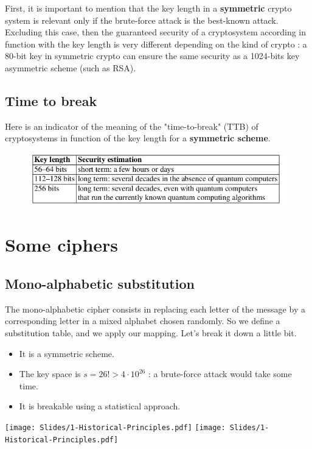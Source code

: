 \documentclass[a4paper, 12pt]{book}
\begin{document}
First, it is important to mention that the key length in a \textbf{symmetric} crypto system is relevant only if the brute-force attack is the best-known attack. \\

Excluding this case, then the guaranteed security of a cryptosystem according in function with the key length is very different depending on the kind of crypto : a 80-bit key in symmetric crypto can ensure the same security as a 1024-bits key asymmetric scheme (such as RSA).

\subsection{Time to break}
Here is an indicator of the meaning of the "time-to-break" (TTB) of cryptosystems in function of the key length for a \textbf{symmetric scheme}.
\begin{figure}[h]
    \centering
    \includegraphics[width=0.7\linewidth]{images/1-TTB.png}
\end{figure}
\section{Some ciphers}
\subsection{Mono-alphabetic substitution}
The mono-alphabetic cipher consists in replacing each letter of the message by a corresponding letter in a mixed alphabet chosen randomly. So we define a substitution table, and we apply our mapping. Let's break it down a little bit.
\begin{itemize}
    \item It is a symmetric scheme.
    \item The key space is $s = 26! > 4\cdot 10 ^{26}$ : a brute-force attack would take some time.
    \item It is breakable using a statistical approach.
\end{itemize}
\begin{center}
    \texttt{[image: Slides/1-Historical-Principles.pdf]}
    \texttt{[image: Slides/1-Historical-Principles.pdf]}
\end{center}
\end{document}
